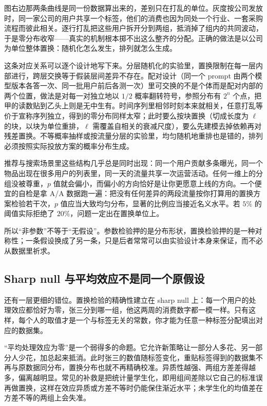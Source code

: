 图右边那两条曲线是同一份数据算出来的，差别只在打乱的单位。灰度按公司发放时，同一家公司的用户共享一个标签，他们的消费也因为同处一个行业、一套采购流程而彼此相关。逐行打乱把这些用户拆开分到两组，抵消掉了组内的共同波动，于是零分布收窄——真实的机制根本掷不出这么整齐的分配。正确的做法是以公司为单位整体置换：随机化怎么发生，排列就怎么生成。

这条对应关系可以逐个设计地写下来。分层随机化的实验里，置换限制在每一层内部进行，跨层交换等于假装层间差异不存在。配对设计（同一个 prompt 由两个模型版本各答一次、同一批用户前后各测一次）里可交换的不是个体而是配对内部的两个位置，做法是对每一对独立地以 \(1/2\) 概率翻转符号，参照分布有 \(2^n\) 个点，把甲的读数贴到乙头上则是无中生有。时间序列里相邻时刻本来就相关，任意打乱等价于宣称序列独立，得到的零分布同样太窄；此时要么按块置换（切成长度为 \(\ell\) 的块，以块为单位重排，\(\ell\) 需覆盖自相关的衰减尺度），要么先建模去掉依赖再对残差置换。不等概率抽样或按流量分层的实验里，均匀随机地重排也是错的，排列必须按照实际投放方案的概率分布生成。

推荐与搜索场景里这些结构几乎总是同时出现：同一个用户贡献多条曝光，同一个物品出现在很多用户的列表里，同一天的流量共享一次运营活动。任何一维上的分组没被尊重，\(p\) 值就会偏小，而偏小的方向恰好是让你更愿意上线的方向。一个便宜的自检是拿 A/A 数据跑一遍：把没有任何差异的两段流量按你打算用的置换方案检验若干次，\(p\) 值应当大致均匀分布，显著的比例应当接近名义水平。若 \(5\%\) 的阈值实际拒绝了 \(20\%\)，问题一定出在置换单位上。

所以``非参数''不等于``无假设''。参数检验押的是分布形状，置换检验押的是一种对称性；一条假设换成了另一条，只是后者常常可以由实验设计本身来保证，而不必从数据里祈求。

\subsection{Sharp null 与平均效应不是同一个原假设}

还有一层更细的错位。置换检验的精确性建立在 sharp null 上：每一个用户的处理效应都恰好为零，张三分到哪一组，他这两周的消费数字都一模一样。只有这样，每个人的取值才是一个与标签无关的常数，你才能为任意一种标签分配填出对应的数据集。

``平均处理效应为零''是一个弱得多的命题。它允许新策略让一部分人多花、另一部分人少花，加总起来抵消。此时张三的数值随标签变化，重贴标签得到的数据集不再与原数据同分布，置换分布也就不再精确校准。异质性越强、两组方差差得越多，偏离越明显。常见的补救是把统计量学生化，即用组间差除以它自己的标准误再做置换，这样在效应异质或方差不等时仍能保住渐近水平；未学生化的均值差在方差不等的两组上会失准。

